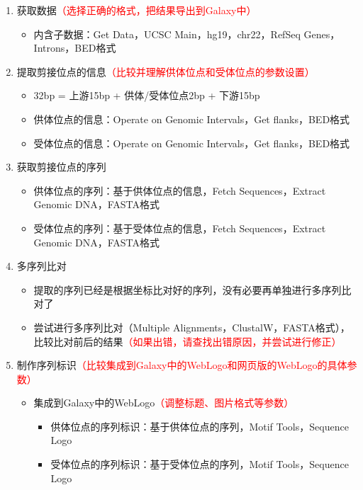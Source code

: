 \documentclass{TIJMUjiaoanSY}
\begin{document}
\begin{enumerate}
  \item 获取数据\textcolor{red}{（选择正确的格式，把结果导出到Galaxy中）}
    \begin{itemize}
      \item 内含子数据：Get Data，UCSC Main，hg19，chr22，RefSeq Genes，Introns，BED格式
    \end{itemize}
  \item 提取剪接位点的信息\textcolor{red}{（比较并理解供体位点和受体位点的参数设置）}
    \begin{itemize}
      \item 32bp = 上游15bp + 供体/受体位点2bp + 下游15bp
      \item 供体位点的信息：Operate on Genomic Intervals，Get flanks，BED格式
      \item 受体位点的信息：Operate on Genomic Intervals，Get flanks，BED格式
    \end{itemize}
  \item 获取剪接位点的序列
    \begin{itemize}
      \item 供体位点的序列：基于供体位点的信息，Fetch Sequences，Extract Genomic DNA，FASTA格式
      \item 受体位点的序列：基于受体位点的信息，Fetch Sequences，Extract Genomic DNA，FASTA格式
    \end{itemize}
  \item 多序列比对
    \begin{itemize}
      \item 提取的序列已经是根据坐标比对好的序列，没有必要再单独进行多序列比对了
      \item 尝试进行多序列比对（Multiple Alignments，ClustalW，FASTA格式），比较比对前后的结果\textcolor{red}{（如果出错，请查找出错原因，并尝试进行修正）} \end{itemize}
      \item 制作序列标识\textcolor{red}{（比较集成到Galaxy中的WebLogo和网页版的WebLogo的具体参数）}
    \begin{itemize}
      \item 集成到Galaxy中的WebLogo\textcolor{red}{（调整标题、图片格式等参数）}
	\begin{itemize}
	  \item 供体位点的序列标识：基于供体位点的序列，Motif Tools，Sequence Logo
	  \item 受体位点的序列标识：基于受体位点的序列，Motif Tools，Sequence Logo
	\end{itemize}

\end{itemize}
\end{enumerate}
\end{document}
